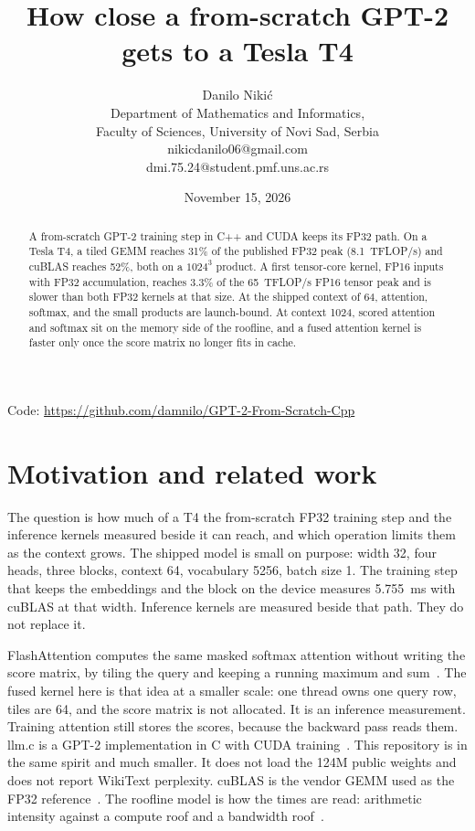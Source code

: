 \documentclass[11pt]{article}
\title{How close a from-scratch GPT-2 gets to a Tesla T4}
\author{Danilo Nikić\\
Department of Mathematics and Informatics,\\
Faculty of Sciences, University of Novi Sad, Serbia\\
nikicdanilo06@gmail.com\\
dmi.75.24@student.pmf.uns.ac.rs}
\date{November 15, 2026}
\begin{document}
\maketitle

\begin{abstract}
A from-scratch GPT-2 training step in C++ and CUDA keeps its FP32 path.
On a Tesla T4, a tiled GEMM reaches 31\% of the published FP32 peak (8.1~TFLOP/s) and cuBLAS reaches 52\%, both on a $1024^3$ product.
A first tensor-core kernel, FP16 inputs with FP32 accumulation, reaches 3.3\% of the 65~TFLOP/s FP16 tensor peak and is slower than both FP32 kernels at that size.
At the shipped context of 64, attention, softmax, and the small products are launch-bound.
At context 1024, scored attention and softmax sit on the memory side of the roofline, and a fused attention kernel is faster only once the score matrix no longer fits in cache.
\end{abstract}

\noindent Code: \url{https://github.com/damnilo/GPT-2-From-Scratch-Cpp}

\section{Motivation and related work}

The question is how much of a T4 the from-scratch FP32 training step and the inference kernels measured beside it can reach, and which operation limits them as the context grows.
The shipped model is small on purpose: width 32, four heads, three blocks, context 64, vocabulary 5256, batch size 1.
The training step that keeps the embeddings and the block on the device measures 5.755~ms with cuBLAS at that width.
Inference kernels are measured beside that path. They do not replace it.

FlashAttention computes the same masked softmax attention without writing the score matrix, by tiling the query and keeping a running maximum and sum~\cite{flash}.
The fused kernel here is that idea at a smaller scale: one thread owns one query row, tiles are 64, and the score matrix is not allocated.
It is an inference measurement. Training attention still stores the scores, because the backward pass reads them.
llm.c is a GPT-2 implementation in C with CUDA training~\cite{llmc}.
This repository is in the same spirit and much smaller. It does not load the 124M public weights and does not report WikiText perplexity.
cuBLAS is the vendor GEMM used as the FP32 reference~\cite{cublas}.
The roofline model is how the times are read: arithmetic intensity against a compute roof and a bandwidth roof~\cite{roofline}.
\end{document}
